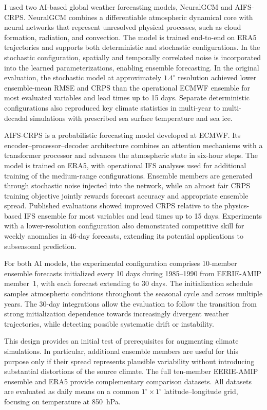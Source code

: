 I used two AI-based global weather forecasting models, NeuralGCM and AIFS-CRPS. NeuralGCM \citep{kochkov_neural_2024} combines a differentiable atmospheric dynamical core with neural networks that represent unresolved physical processes, such as cloud formation, radiation, and convection. The model is trained end-to-end on ERA5 trajectories and supports both deterministic and stochastic configurations. In the stochastic configuration, spatially and temporally correlated noise is incorporated into the learned parameterizations, enabling ensemble forecasting. In the original evaluation, the stochastic model at approximately $1.4^\circ$ resolution achieved lower ensemble-mean RMSE and CRPS than the operational ECMWF ensemble for most evaluated variables and lead times up to 15 days. Separate deterministic configurations also reproduced key climate statistics in multi-year to multi-decadal simulations with prescribed sea surface temperature and sea ice.

AIFS-CRPS \citep{lang_aifs-crps_2026} is a probabilistic forecasting model developed at ECMWF. Its encoder--processor--decoder architecture combines an attention mechanisms with a transformer processor and advances the atmospheric state in six-hour steps. The model is trained on ERA5, with operational IFS analyses used for additional training of the medium-range configurations. Ensemble members are generated through stochastic noise injected into the network, while an almost fair CRPS training objective jointly rewards forecast accuracy and appropriate ensemble spread. Published evaluations showed improved CRPS relative to the physics-based IFS ensemble for most variables and lead times up to 15 days. Experiments with a lower-resolution configuration also demonstrated competitive skill for weekly anomalies in 46-day forecasts, extending its potential applications to subseasonal prediction.

For both AI models, the experimental configuration comprises 10-member ensemble forecasts initialized every 10 days during 1985--1990 from EERIE-AMIP member~1, with each forecast extending to 30 days. The initialization schedule samples atmospheric conditions throughout the seasonal cycle and across multiple years. The 30-day integrations allow the evaluation to follow the transition from strong initialization dependence towards increasingly divergent weather trajectories, while detecting possible systematic drift or instability.

This design provides an initial test of prerequisites for augmenting climate simulations. In particular, additional ensemble members are useful for this purpose only if their spread represents plausible variability without introducing substantial distortions of the source climate. The full ten-member EERIE-AMIP ensemble and ERA5 provide complementary comparison datasets. All datasets are evaluated as daily means on a common $1^\circ \times 1^\circ$ latitude--longitude grid, focusing on temperature at 850~hPa.

